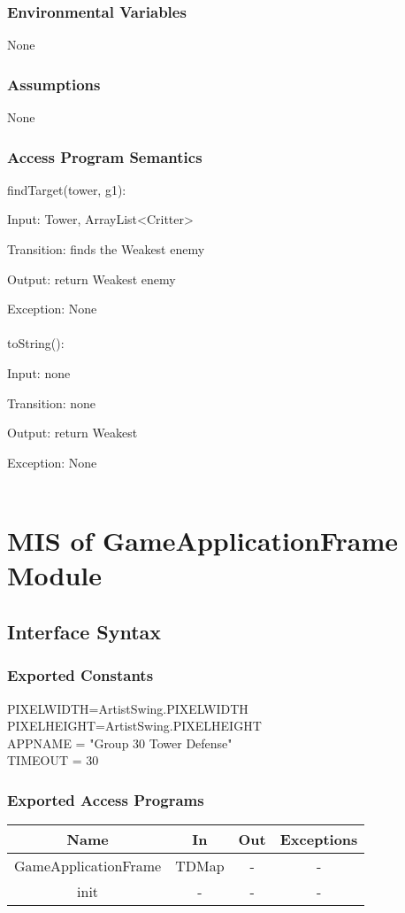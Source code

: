 \documentclass[12,english]{article}
\begin{document}
		\subsubsection{Environmental Variables}
		None
		\subsubsection{Assumptions}
        None

		\subsubsection{Access Program Semantics}
		findTarget(tower, g1):
		
		Input: Tower, ArrayList<Critter>
		
		Transition: finds the Weakest enemy
		
		Output: return Weakest enemy
		
		Exception: None\\
		\\
		toString():
		
		Input: none
		
		Transition: none
		
		Output: return Weakest
		
		Exception: None\\
		\\

		
\section{MIS of GameApplicationFrame Module}
	\subsection{Interface Syntax}
	\subsubsection{Exported Constants}
	    PIXELWIDTH=ArtistSwing.PIXELWIDTH\\
	    PIXELHEIGHT=ArtistSwing.PIXELHEIGHT\\
	    APPNAME = "Group 30 Tower Defense"\\
	    TIMEOUT = 30\\
		\subsubsection{Exported Access Programs}
		
	\begin{tabular}[pos]{|c|c|c|c|}
	\hline
	\textbf{Name}& \textbf{In} & \textbf{Out} & \textbf{Exceptions} \\ 
	\hline
	GameApplicationFrame & TDMap & - & - \\ \hline
	init & - & - & - \\ \hline
	
					
	\end{tabular}		
		
\end{document}
